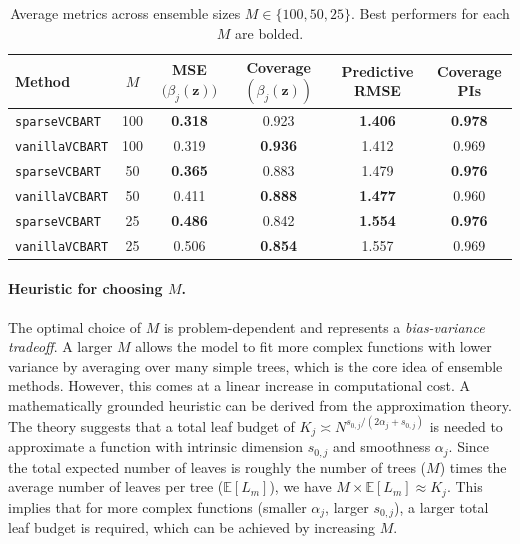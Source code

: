 \documentclass[11pt]{article}
\theoremstyle{plain}
\theoremstyle{definition}
\theoremstyle{plain}
\begin{document}
\begin{table}[H]
\centering
\caption{Average metrics across ensemble sizes $M \in \{100,50,25\}$. Best performers for each $M$ are bolded.}
\label{tab:method-by-M}
\begin{tabular}{
  l
  c
  S[table-format=1.3]
  S[table-format=1.3]
  S[table-format=1.3]
  S[table-format=1.3]
}
\toprule
\textbf{Method} &
\textbf{$M$} &
{\textbf{MSE $\big(\beta_j(\bm{z})\big)$}} &
{\textbf{Coverage $(\beta_j(\bm{z}))$}} &
{\textbf{Predictive RMSE}} &
{\textbf{Coverage PIs}} \\
\midrule
\texttt{sparseVCBART}  & 100 & \textbf{0.318} & 0.923 & \textbf{1.406} & \textbf{0.978} \\
\texttt{vanillaVCBART}  & 100  & 0.319 & \textbf{0.936} & 1.412 & 0.969 \\
\midrule
\texttt{sparseVCBART}  & 50  & \textbf{0.365} & 0.883 & 1.479 & \textbf{0.976} \\
\texttt{vanillaVCBART} & 50 & 0.411 & \textbf{0.888} & \textbf{1.477} & 0.960 \\
\midrule
\texttt{sparseVCBART} & 25  & \textbf{0.486} & 0.842 & \textbf{1.554} & \textbf{0.976} \\
\texttt{vanillaVCBART} & 25  & 0.506 & \textbf{0.854} & 1.557 & 0.969 \\
\bottomrule
\end{tabular}
\end{table}

\paragraph{Heuristic for choosing $M$.}
The optimal choice of $M$ is problem-dependent and represents a \emph{bias-variance tradeoff}. A larger $M$ allows the model to fit more complex functions with lower variance by averaging over many simple trees, which is the core idea of ensemble methods. However, this comes at a linear increase in computational cost. A mathematically grounded heuristic can be derived from the approximation theory. The theory suggests that a total leaf budget of $K_j \asymp N^{s_{0,j}/(2\alpha_j+s_{0,j})}$ is needed to approximate a function with intrinsic dimension $s_{0,j}$ and smoothness $\alpha_j$. Since the total expected number of leaves is roughly the number of trees ($M$) times the average number of leaves per tree ($\mathbb{E}[L_m]$), we have $M \times \mathbb{E}[L_m] \approx K_j$. This implies that for more complex functions (smaller $\alpha_j$, larger $s_{0,j}$), a larger total leaf budget is required, which can be achieved by increasing $M$.
\end{document}
